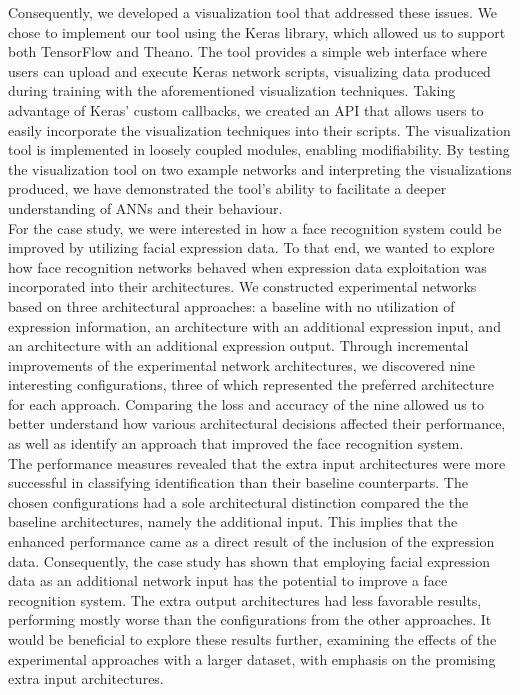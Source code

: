 \noindent Consequently, we developed a visualization tool that addressed these issues. We chose to implement our tool using the Keras library, which allowed us to support both TensorFlow and Theano. The tool provides a simple web interface where users can upload and execute Keras network scripts, visualizing data produced during training with the aforementioned visualization techniques. Taking advantage of Keras' custom callbacks, we created an API that allows users to easily incorporate the visualization techniques into their scripts. The visualization tool is implemented in loosely coupled modules, enabling modifiability. By testing the visualization tool on two example networks and interpreting the visualizations produced, we have demonstrated the tool's ability to facilitate a deeper understanding of ANNs and their behaviour. \\

\noindent For the case study, we were interested in how a face recognition system could be improved by utilizing facial expression data. To that end, we wanted to explore how face recognition networks behaved when expression data exploitation was incorporated into their architectures. We constructed experimental networks based on three architectural approaches: a baseline with no utilization of expression information, an architecture with an additional expression input, and an architecture with an additional expression output. Through incremental improvements of the experimental network architectures, we discovered nine interesting configurations, three of which represented the preferred architecture for each approach. Comparing the loss and accuracy of the nine allowed us to better understand how various architectural decisions affected their performance, as well as identify an approach that improved the face recognition system. \\

\noindent The performance measures revealed that the extra input architectures were more successful in classifying identification than their baseline counterparts. The chosen configurations had a sole architectural distinction compared the the baseline architectures, namely the additional input. This implies that the enhanced performance came as a direct result of the inclusion of the expression data. Consequently, the case study has shown that employing facial expression data as an additional network input has the potential to improve a face recognition system. The extra output architectures had less favorable results, performing mostly worse than the configurations from the other approaches. It would be beneficial to explore these results further, examining the effects of the experimental approaches with a larger dataset, with emphasis on the promising extra input architectures. \\


